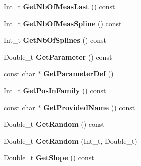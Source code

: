 \begin{DoxyCompactItemize}
\item 
\hypertarget{classTSplineFit_a68f9f91f3f6d69ee5e89ae5c34bac225}{Int\-\_\-t {\bfseries Get\-Nb\-Of\-Meas\-Last} () const }\label{classTSplineFit_a68f9f91f3f6d69ee5e89ae5c34bac225}

\item 
\hypertarget{classTSplineFit_afef352271be947e5eb7b61061a89f534}{Int\-\_\-t {\bfseries Get\-Nb\-Of\-Meas\-Spline} () const }\label{classTSplineFit_afef352271be947e5eb7b61061a89f534}

\item 
\hypertarget{classTSplineFit_a4f965fd2a14a1d60c898f4e51492aaed}{Int\-\_\-t {\bfseries Get\-Nb\-Of\-Splines} () const }\label{classTSplineFit_a4f965fd2a14a1d60c898f4e51492aaed}

\item 
\hypertarget{classTSplineFit_ad75b42637186a1c32ca4c2fd1013ff97}{Double\-\_\-t {\bfseries Get\-Parameter} () const }\label{classTSplineFit_ad75b42637186a1c32ca4c2fd1013ff97}

\item 
\hypertarget{classTSplineFit_a7ba8494513323c4d212e649c0e2cddc5}{const char $\ast$ {\bfseries Get\-Parameter\-Def} ()}\label{classTSplineFit_a7ba8494513323c4d212e649c0e2cddc5}

\item 
\hypertarget{classTSplineFit_aef905799c6e58fd587476a6e225b253a}{Int\-\_\-t {\bfseries Get\-Pos\-In\-Family} () const }\label{classTSplineFit_aef905799c6e58fd587476a6e225b253a}

\item 
\hypertarget{classTSplineFit_a3b7036bfb75e585cd00928e6ad63d305}{const char $\ast$ {\bfseries Get\-Provided\-Name} () const }\label{classTSplineFit_a3b7036bfb75e585cd00928e6ad63d305}

\item 
\hypertarget{classTSplineFit_a0a2b04890810a740dc8899b1d9a5b47e}{Double\-\_\-t {\bfseries Get\-Random} () const }\label{classTSplineFit_a0a2b04890810a740dc8899b1d9a5b47e}

\item 
\hypertarget{classTSplineFit_a4f6786e9b1624c085ff443eef3fdc282}{Double\-\_\-t {\bfseries Get\-Random} (Int\-\_\-t, Double\-\_\-t)}\label{classTSplineFit_a4f6786e9b1624c085ff443eef3fdc282}

\item 
\hypertarget{classTSplineFit_a58296fcc13b002f272a5ec1410ef73eb}{Double\-\_\-t {\bfseries Get\-Slope} () const }\label{classTSplineFit_a58296fcc13b002f272a5ec1410ef73eb}


\end{DoxyCompactItemize}
